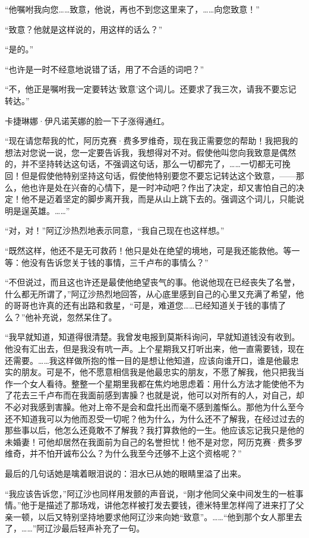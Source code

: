 \par “他嘱咐我向您……致意，他说，再也不到您这里来了，……向您致意！”
\par “致意？他就是这样说的，用这样的话么？”
\par “是的。”
\par “也许是一时不经意地说错了话，用了不合适的词吧？”
\par “不，他正是嘱咐我一定要转达‘致意’这个词儿。还要求了我三次，请我不要忘记转达。”
\par 卡捷琳娜·伊凡诺芙娜的脸一下子涨得通红。
\par “现在请您帮我的忙，阿历克赛·费多罗维奇，现在我正需要您的帮助！我把我的想法对您说一说，您一定要告诉我，我想得对不对。假使他叫您向我致意是偶然的，并不坚持转达这句话，不强调这句话，那么一切都完了，……一切都无可挽回！但是假使他特别坚持这句话，假使他特别要您不要忘记转达这个致意，——那么，他也许是处在兴奋的心情下，是一时冲动吧？作出了决定，却又害怕自己的决定！他不是迈着坚定的脚步离开我，而是从山上跳下去的。强调这个词儿，只能说明是逞英雄。……”
\par “对，对！”阿辽沙热烈地表示同意，“我自己现在也这样想。”
\par “既然这样，他还不是无可救药！他只是处在绝望的境地，可是我还能救他。等一等：他没有告诉您关于钱的事情，三千卢布的事情么？”
\par “不但说过，而且这也许还是最使他绝望丧气的事。他说他现在已经丧失了名誉，什么都无所谓了，”阿辽沙热烈地回答，从心底里感到自己的心里又充满了希望，他的哥哥也许真的还有出路和救星，“可是，难道您……已经知道关于钱的事情了么？”他补充说，忽然呆住了。
\par “我早就知道，知道得很清楚。我曾发电报到莫斯科询问，早就知道钱没有收到。他没有汇出去，但是我没有吭一声。上个星期我又打听出来，他一直需要钱，现在还需要。……我这样做所抱的惟一目的是想让他知道，应该向谁开口，谁是他最忠实的朋友。可是不，他不愿意相信我是他最忠实的朋友，不愿了解我，他只把我当作一个女人看待。整整一个星期里我都在焦灼地思虑着：用什么方法才能使他不为了花去三千卢布而在我面前感到害臊？也就是说，他可以对所有的人，对自己，却不必对我感到害臊。他对上帝不是会和盘托出而毫不感到羞惭么。那他为什么至今还不知道我可以为他而忍受一切呢？他为什么，为什么还不了解我，在经过过去的那些事以后，他怎么还竟敢不了解我？我打算救他的一生。他应该忘记我只是他的未婚妻！可他却居然在我面前为自己的名誉担忧！他不是对您，阿历克赛·费多罗维奇，并不怕开诚布公么？为什么我至今还够不上这个资格呢？”
\par 最后的几句话她是噙着眼泪说的：泪水已从她的眼睛里溢了出来。
\par “我应该告诉您，”阿辽沙也同样用发颤的声音说，“刚才他同父亲中间发生的一桩事情。”他于是描述了那场戏，讲他怎样被打发去要钱，德米特里怎样闯了进来打了父亲一顿，以后又特别坚持地要求他阿辽沙来向她“致意”。……“他到那个女人那里去了，……”阿辽沙最后轻声补充了一句。
